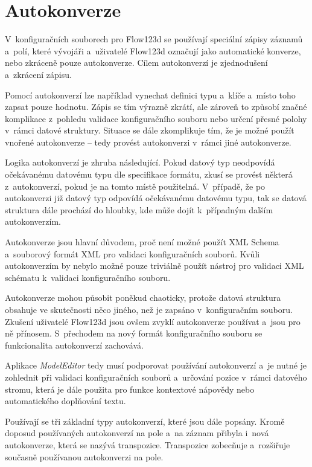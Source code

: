 \documentclass[FM,bw,DP]{tulthesis}
\begin{document}
\section{Autokonverze}
\label{sec:analyza-autokonverze}

V~konfiguračních souborech pro Flow123d se používají speciální zápisy záznamů a~polí, které vývojáři a~uživatelé Flow123d označují jako automatické konverze, nebo zkráceně pouze autokonverze. Cílem autokonverzí je zjednodušení a~zkrácení zápisu.

Pomocí autokonverzí lze například vynechat definici typu a~klíče a~místo toho zapsat pouze hodnotu. Zápis se tím výrazně zkrátí, ale zároveň to způsobí značné komplikace z~pohledu validace konfiguračního souboru nebo určení přesné polohy v~rámci datové struktury. Situace se dále zkomplikuje tím, že je možné použít vnořené autokonverze -- tedy provést autokonverzi v~rámci jiné autokonverze.

Logika autokonverzí je zhruba následující. Pokud datový typ neodpovídá o\-če\-ká\-va\-né\-mu datovému typu dle specifikace formátu, zkusí se provést některá z~autokonverzí, pokud je na tomto místě použitelná. V~případě, že po autokonverzi již datový typ odpovídá očekávanému datovému typu, tak se datová struktura dále prochází do hloubky, kde může dojít k~případným dalším autokonverzím.

Autokonverze jsou hlavní důvodem, proč není možné použít \gls{XML} Schema a~souborový formát \gls{XML} pro validaci konfiguračních souborů. Kvůli autokonverzím by nebylo možné pouze triviálně použít nástroj pro validaci \gls{XML} schématu k~validaci konfiguračního souboru.

Autokonverze mohou působit poněkud chaoticky, protože datová struktura obsahuje ve skutečnosti něco jiného, než je zapsáno v~konfiguračním souboru. Zkušení uživatelé Flow123d jsou ovšem zvyklí autokonverze používat a~jsou pro ně přínosem. S~přechodem na nový formát konfiguračního souboru se funkcionalita autokonverzí zachovává.

Aplikace \textit{ModelEditor} tedy musí podporovat používání autokonverzí a~je nutné je zohlednit při validaci konfiguračních souborů a~určování pozice v~rámci datového stromu, která je dále použita pro funkce kontextové nápovědy nebo automatického doplňování textu. 

Používají se tři základní typy autokonverzí, které jsou dále popsány. Kromě doposud používaných autokonverzí na pole a~na záznam přibyla i~nová autokonverze, která se nazývá transpozice. Transpozice zobecňuje a~rozšiřuje současně používanou autokonverzi na pole.
\end{document}
